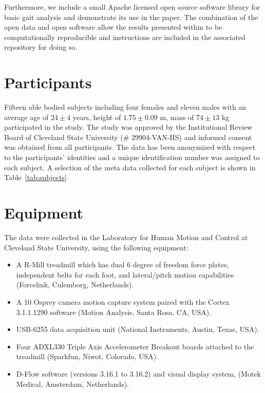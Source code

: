 \documentclass[fleqn,10pt]{wlpeerj}
\begin{document}
Furthermore, we include a small Apache licensed open source software library
for basic gait analysis and demonstrate its use in the paper. The combination
of the open data and open software allow the results presented within to be
computationally reproducible and instructions are included in the associated
repository for doing so.

\section*{Participants}
%
Fifteen able bodied subjects including four females and eleven males with an
average age of $24\pm4$ years, height of $1.75\pm0.09$ m, mass of $74\pm13$ kg
participated in the study. The study was approved by the Institutional Review
Board of Cleveland State University (\# 29904-VAN-HS) and informed consent was
obtained from all participants. The data has been anonymized with respect to the
participants' identities and a unique identification number was assigned to
each subject. A selection of the meta data collected for each subject is shown
in Table~\ref{tab:subjects}.
%
\begin{table}
  \cprotect\caption{Information about the 15 participants. The final three
    columns give the trial numbers associated with each nominal treadmill
    speed. The measured mass is computed from the mean total vertical ground
    reaction force just after the calibration pose event, if possible.
    Additional trials found in the data set with a subject identification
    number 0 are trials with no subject, i.e.  unloaded trials that can be used
    for inertial compensation purposes, and are not shown in the table. Generated
    by \verb|src/subject_table.py|.}
  \centering
  \small
  
  \label{tab:subjects}
\end{table}

\section*{Equipment}
%
The data were collected in the Laboratory for Human Motion and Control at
Cleveland State University, using the following equipment:

\begin{itemize}
  \item A R-Mill treadmill which has dual 6 degree of freedom force plates,
    independent belts for each foot, and lateral/pitch motion capabilities
    (Forcelink, Culemborg, Netherlands).
  \item A 10 Osprey camera motion capture system paired with the Cortex
    3.1.1.1290 software (Motion Analysis, Santa Rosa, CA, USA).
  \item USB-6255 data acquisition unit (National Instruments, Austin, Texas,
    USA).
  \item Four ADXL330 Triple Axis Accelerometer Breakout boards attached to the
    treadmill (Sparkfun, Niwot, Colorado, USA).
  \item D-Flow software (versions 3.16.1 to 3.16.2) and visual display system,
    (Motek Medical, Amsterdam, Netherlands).
\end{itemize}
\end{document}

